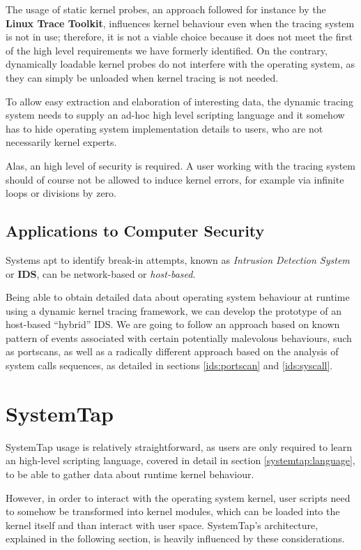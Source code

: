 \documentclass[11pt]{article}
\begin{document}
The usage of static kernel probes, an approach followed for instance by the
\textbf{Linux Trace Toolkit}, influences kernel behaviour even when the tracing
system is not in use; therefore, it is not a viable choice because it does not
meet the first of the high level requirements we have formerly identified. On
the contrary, dynamically loadable kernel probes do not interfere with the
operating system, as they can simply be unloaded when kernel tracing is not
needed.

To allow easy extraction and elaboration of interesting data, the dynamic
tracing system needs to supply an ad-hoc high level scripting language and it
somehow has to hide operating system implementation details to users, who are
not necessarily kernel experts.

Alas, an high level of security is required. A user working with the tracing
system should of course not be allowed to induce kernel errors, for example
via infinite loops or divisions by zero.

\subsection{Applications to Computer Security}
Systems apt to identify break-in attempts, known as \emph{Intrusion Detection
System} or \textbf{IDS}, can be network-based or \emph{host-based}.

Being able to obtain detailed data about operating system behaviour at runtime
using a dynamic kernel tracing framework, we can develop the prototype of an
host-based ``hybrid'' IDS. We are going to follow an approach based on known
pattern of events associated with certain potentially malevolous behaviours,
such as portscans, as well as a radically different approach based on the
analysis of system calls sequences, as detailed in sections \ref{ids:portscan}
and \ref{ids:syscall}.

\pagebreak

\section{SystemTap}
SystemTap usage is relatively straightforward, as users are only required to
learn an high-level scripting language,  covered in detail in section
\ref{systemtap:language}, to be able to gather data about runtime kernel
behaviour.

However, in order to interact with the operating system kernel, user scripts
need to somehow be transformed into kernel modules, which can be loaded into
the kernel itself and than interact with user space. SystemTap's architecture,
explained in the following section, is heavily influenced by these
considerations.
\end{document}
